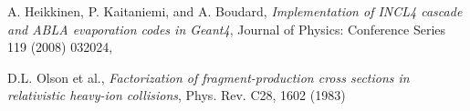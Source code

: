 \documentclass[20pt]{article}
\newenvironment{textbox}
{\begin{lrbox}{\dummybox}\begin{minipage}{0.9\columnwidth}}
{\end{minipage}\end{lrbox}\raisebox{-\depth}{\psshadowbox[framesep=1em,framearc=.1,shadow=true]{\usebox{\dummybox}}}\vspace{0.005\textheight}}
\begin{document}
\begin{center}
\begin{multicols}{3}
\begin{textbox}
{\begin{thebibliography}{9}
A. Heikkinen, P. Kaitaniemi, and A. Boudard,
{\em Implementation of INCL4 cascade and ABLA evaporation codes in Geant4},
Journal of Physics: Conference Series 119 (2008) 032024, 
{\sf [doi:10.1088/1742-6596/119/3/032024]}

D.L. Olson et al.,
{\em Factorization of fragment-production cross sections in relativistic heavy-ion collisions},
Phys. Rev. C28, 1602 (1983)
{}

%
%
\end{thebibliography}
}

\end{textbox}

\end{multicols}

\end{center}
\end{document}
